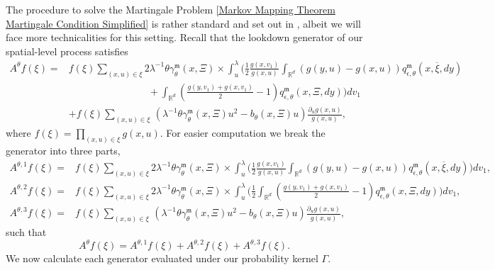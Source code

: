 \documentclass[12pt]{article}
\def \bar{\overline}
\newcommand{\IR}{\mathbb R}
\begin{document}
The procedure to solve the Martingale Problem \eqref{Markov Mapping Theorem Martingale Condition Simplified} is rather standard and set out in \cite{kurtz/rodrigues:2011}, albeit we will face more technicalities for this setting. Recall that the lookdown generator of our spatial-level process satisfies
\begin{align}\label{Lookdown generator N lambda theta prelimit}
A^{\theta}f(\xi)=&f(\xi)\sum_{(x,u)\in\xi}2\lambda^{-1}\theta\gamma^{\mathfrak{m}}_{\theta}(x,\Xi)\times
\int_u^{
\lambda}\Bigg(\frac 12\frac{g(x,v_1)}{g(x,u)}\int_{\IR^d} (g(y,u)-g(x,u))q^{\mathfrak{m}}_{\epsilon,\theta}(x,\bar{
\xi },dy) \nonumber \\
& \qquad \qquad \qquad \qquad +\int_{\IR^d} \left(\frac{g(y,v_1)+g(x,v_1)}{2}-1\right)q^{\mathfrak{m}}_{\epsilon,\theta}(x,\Xi,dy)\Bigg)dv_1 \nonumber\\
&+f(\xi )\sum_{(x,u)\in\xi}\,\left(\lambda^{-1} \theta \gamma^{\mathfrak{m}}_{\theta}(x,\Xi) u^2 -b_{\theta}(x,\Xi)u\right)\frac {\partial_u g(x,u)}{g(x,u)},
\end{align}
where $f(\xi) =\prod_{(x,u) \in \xi}g(x,u)$. 
For easier computation we break the generator into three parts, 
\begin{equation}
\begin{aligned}
A^{\theta,1}f(\xi)=&f(\xi)\sum_{(x,u)\in\xi}2\lambda^{-1}\theta\gamma^{\mathfrak{m}}_{\theta}(x,\Xi)\times
\int_u^{
\lambda}\Bigg(\frac 12\frac{g(x,v_1)}{g(x,u)}\int_{\IR^d} (g(y,u)-g(x,u))q^{\mathfrak{m}}_{\epsilon,\theta}(x,\bar{
\xi },dy)\Bigg)dv_1,\\
A^{\theta,2}f(\xi)=&f(\xi)\sum_{(x,u)\in\xi}2\lambda^{-1}\theta\gamma^{\mathfrak{m}}_{\theta}(x,\Xi)\times
\int_u^{
\lambda}\Bigg(\frac{1}{2}\int_{\IR^d} \left(\frac{g(y,v_1)+g(x,v_1)}{2}-1\right)q^{\mathfrak{m}}_{\epsilon,\theta}(x,\Xi,dy)\Bigg)dv_1,\\
A^{\theta,3}f(\xi)=&f(\xi )\sum_{(x,u)\in\xi}\,\left(\lambda^{-1} \theta \gamma^{\mathfrak{m}}_{\theta}(x,\Xi) u^2 -b_{\theta}(x,\Xi)u\right)\frac {\partial_u g(x,u)}{g(x,u)},
\end{aligned}
\end{equation}
such that 
$$A^{\theta}f(\xi)=A^{\theta,1}f(\xi)+A^{\theta,2}f(\xi)+A^{\theta,3}f(\xi).$$
We now calculate each generator evaluated under our probability kernel $\Gamma$.
\footnotesize 
\end{document}
